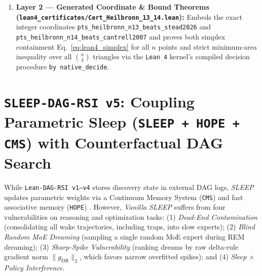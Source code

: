 \documentclass[11pt,a4paper]{article}
\begin{document}
\begin{enumerate}
\item \textbf{Layer 2 --- Generated Coordinate \& Bound Theorems (\texttt{lean4\_certificates/Cert\_Heilbronn\_13\_14.lean}):} Embeds the exact integer coordinates \texttt{pts\_heilbronn\_n13\_beats\_stead2026} and \texttt{pts\_heilbronn\_n14\_beats\_cantrell2007} and proves both simplex containment Eq.~\eqref{eq:lean4_simplex} for all $n$ points and strict minimum-area inequality over all $\binom{n}{3}$ triangles via the \texttt{Lean 4} kernel's compiled decision procedure \texttt{by native\_decide}.
\end{enumerate}

\section{\texttt{SLEEP-DAG-RSI v5}: Coupling Parametric Sleep (\texttt{SLEEP + HOPE + CMS}) with Counterfactual DAG Search}
\label{sec:v5}

While \texttt{Lean-DAG-RSI v1--v4} stores discovery state in external DAG logs, \emph{SLEEP} \cite{sleep2026} updates parametric weights via a Continuum Memory System (\texttt{CMS}) and fast associative memory (\texttt{HOPE}) \cite{hope2025}. However, \emph{Vanilla SLEEP} suffers from four vulnerabilities on reasoning and optimization tasks: (1) \emph{Dead-End Contamination} (consolidating all wake trajectories, including traps, into slow experts); (2) \emph{Blind Random MoE Dreaming} (sampling a single random MoE expert during REM dreaming); (3) \emph{Sharp-Spike Vulnerability} (ranking dreams by raw delta-rule gradient norm $\|g_{\text{DR}}\|_2$, which favors narrow overfitted spikes); and (4) \emph{Sleep $\times$ Policy Interference}.
\end{document}
